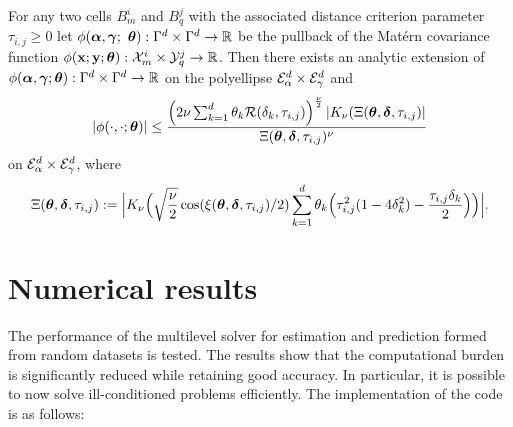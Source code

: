 \documentclass[11pt,final]{amsart}       %
\begin{document}
\begin{theorem} For any two cells $B^{i}_{m}$ and $B^{j}_{q}$
with the associated distance criterion parameter $\tau_{i,j} \geq 0$
let $\phi(\boldsymbol{\alpha},\boldsymbol{\gamma};$ $\boldsymbol{\theta}):\Gamma^d \times \Gamma^d
\rightarrow \Bbb{R}$ be the pullback of the Mat\'{e}rn covariance function
$\phi(\mathbf{x};\mathbf{y};\boldsymbol{\theta}):\mathcal{X}^{i}_m \times \mathcal{Y}^{j}_{q} \rightarrow
\Bbb{R}$. Then there exists an analytic extension of
$\phi(\boldsymbol{\alpha},\boldsymbol{\gamma};\boldsymbol{\theta}):\Gamma^d \times \Gamma^d \rightarrow
\Bbb{R}$ on the polyellipse $ {\mathcal E}^{d}_{\alpha} \times {\mathcal E}^{d}_{\gamma} $
and
  \[
  |\phi(\cdot,\cdot;\boldsymbol{\theta})| \leq
\frac{  \left( 2 \nu \sum_{k=1}^{d} \theta_k {\mathcal R}(\delta_k,\tau_{i,j})
\right)^{\frac{\nu}{2}}
|K_{\nu}
(\Xi(\boldsymbol{\theta},\boldsymbol{\delta},\tau_{i,j}
)|}{
\Xi(\boldsymbol{\theta},\boldsymbol{\delta},\tau_{i,j})^{\nu}
}
\]
on ${\mathcal E}^{d}_{\alpha} \times {\mathcal E}^{d}_{\gamma}$, where
\[
\begin{split}
  \Xi(\boldsymbol{\theta},\boldsymbol{\delta},\tau_{i,j})
  :=
\Big| K_{\nu}\Big(\sqrt{\frac{\nu}{2}}
  \cos(\xi(\boldsymbol{\theta},\boldsymbol{\delta},\tau_{i,j})/2)
\sum_{k=1}^{d} \theta_k 
  \Big(
  \tau_{i,j}^2 (1 - 4 \delta_{k}^2) - \frac{\tau_{i,j}
    \delta_{k}}{2} \Big)
  \Big) \Big|.
  \end{split}
\]


\end{theorem}

\section{Numerical results}
\label{numericalresults}

The performance of the multilevel solver for estimation and
prediction formed from random datasets is tested. The results show
that the computational burden is significantly reduced while retaining
good accuracy. In particular, it is possible to now solve
ill-conditioned problems efficiently. The implementation of the code
is as follows:
\end{document}

